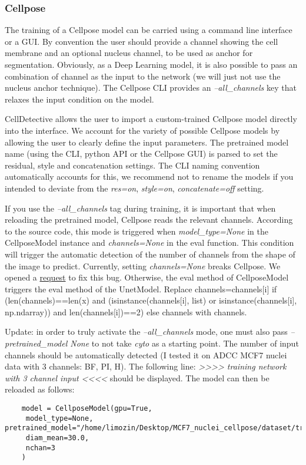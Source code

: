 \documentclass[10pt,a4paper]{article}
\begin{document}
	\subsubsection{Cellpose}
	
	The training of a Cellpose model can be carried using a command line interface or a GUI. By convention the user should provide a channel showing the cell membrane and an optional nucleus channel, to be used as anchor for segmentation. Obviously, as a Deep Learning model, it is also possible to pass an combination of channel as the input to the network (we will just not use the nucleus anchor technique). The Cellpose CLI provides an \textit{--all\_channels} key that relaxes the input condition on the model. 
	
	CellDetective allows the user to import a custom-trained Cellpose model directly into the interface. We account for the variety of possible Cellpose models by allowing the user to clearly define the input parameters. The pretrained model name (using the CLI, python API or the Cellpose GUI) is parsed to set the residual, style and concatenation settings. The CLI naming convention automatically accounts for this, we recommend not to rename the models if you intended to deviate from the \textit{res=on}, \textit{style=on}, \textit{concatenate=off} setting. 
	
	If you use the \textit{--all\_channels} tag during training, it is important that when reloading the pretrained model, Cellpose reads the relevant channels. According to the source code, this mode is triggered when \textit{model\_type=None} in the CellposeModel instance and \textit{channels=None} in the eval function. This condition will trigger the automatic detection of the number of channels from the shape of the image to predict. Currently, setting \textit{channels=None} breaks Cellpose. We opened a \href{https://github.com/MouseLand/cellpose/issues/762}{request} to fix this bug. Otherwise, the eval method of CellposeModel triggers the eval method of the UnetModel. Replace channels=channels[i] if (len(channels)==len(x) and (isinstance(channels[i], list) or isinstance(channels[i], np.ndarray)) and len(channels[i])==2) else channels with channels.
	
	\par{}Update: in order to truly activate the \textit{--all\_channels} mode, one must also pass \textit{--pretrained\_model None} to not take \textit{cyto} as a starting point. The number of input channels should be automatically detected (I tested it on ADCC MCF7 nuclei data with 3 channels: BF, PI, H). The following line:  \textit{>>>> training network with 3 channel input <<<<} should be displayed. The model can then be reloaded as follows:
	
	\begin{verbatim}
	model = CellposeModel(gpu=True, 
	 model_type=None, pretrained_model="/home/limozin/Desktop/MCF7_nuclei_cellpose/dataset/train/augmented/models/cellpose_residual_on_style_on_concatenation_off_augmented_2023_08_09_10_28_34.822385",
	 diam_mean=30.0, 
	 nchan=3
	)
	\end{verbatim}
\end{document}
